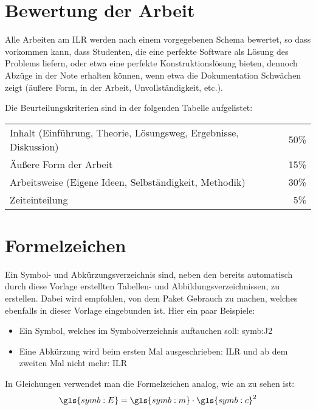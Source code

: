 \section{Bewertung der Arbeit}

Alle Arbeiten am ILR werden nach einem vorgegebenen Schema bewertet, so dass vorkommen kann, dass Studenten, die eine perfekte Software als Lösung
des Problems liefern, oder etwa eine perfekte Konstruktionslösung bieten, dennoch Abzüge in der Note erhalten können,
wenn etwa die Dokumentation Schwächen zeigt (äußere Form,  in der Arbeit, Unvollständigkeit, etc.).

Die Beurteilungskriterien sind in der folgenden Tabelle aufgelistet:
\begin{table}[h!]
 \centering
 \begin{tabular}{lr}
  Inhalt (Einführung, Theorie, Lösungsweg, Ergebnisse, Diskussion) & 50\% \\
  Äußere Form der Arbeit & 15\% \\
  Arbeitsweise (Eigene Ideen, Selbständigkeit, Methodik) & 30\% \\
  Zeiteinteilung & 5\% \\
 \end{tabular}

\end{table}

\section{Formelzeichen}

Ein Symbol- und Abk\"urzungsverzeichnis sind, neben den bereits automatisch 
durch diese Vorlage erstellten Tabellen- und Abbildungsverzeichnissen, zu erstellen.
Dabei wird empfohlen, von dem Paket  Gebrauch zu machen, welches 
ebenfalls in dieser Vorlage eingebunden ist. Hier ein paar Beispiele:
\begin{itemize}
 \item Ein Symbol, welches im Symbolverzeichnis auftauchen soll: \gls{symb:J2}
 \item Eine Abk\"urzung wird beim ersten Mal ausgeschrieben: \gls{ILR} und ab dem zweiten Mal nicht mehr: \gls{ILR}
\end{itemize}
In Gleichungen verwendet man die Formelzeichen analog, wie an  zu sehen ist:
\begin{equation}
 \gls{symb:E} = \gls{symb:m}\cdot \gls{symb:c}^2 \label{eq:beispiel}
\end{equation}

